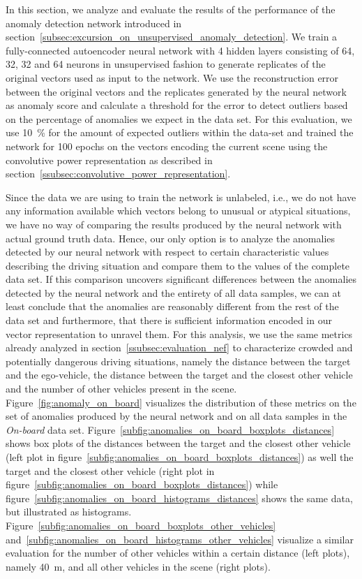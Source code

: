 In this section, we analyze and evaluate the results of the performance of the anomaly detection network introduced in section~\ref{subsec:excursion_on_unsupervised_anomaly_detection}.
We train a fully-connected autoencoder neural network with \num{4} hidden layers consisting of \num{64}, \num{32}, \num{32} and \num{64} neurons in unsupervised fashion to generate replicates of the original vectors used as input to the network.
We use the reconstruction error between the original vectors and the replicates generated by the neural network as anomaly score and calculate a threshold for the error to detect outliers based on the percentage of anomalies we expect in the data set.
For this evaluation, we use \SI{10}{\percent} for the amount of expected outliers within the data-set and trained the network for \num{100} epochs on the vectors encoding the current scene using the convolutive power representation as described in section~\ref{ssubsec:convolutive_power_representation}.

Since the data we are using to train the network is unlabeled, i.e., we do not have any information available which vectors belong to unusual or atypical situations, we have no way of comparing the results produced by the neural network with actual ground truth data.
Hence, our only option is to analyze the anomalies detected by our neural network with respect to certain characteristic values describing the driving situation and compare them to the values of the complete data set.
If this comparison uncovers significant differences between the anomalies detected by the neural network and the entirety of all data samples, we can at least conclude that the anomalies are reasonably different from the rest of the data set and furthermore, that there is sufficient information encoded in our vector representation to unravel them.
For this analysis, we use the same metrics already analyzed in section~\ref{ssubsec:evaluation_nef} to characterize crowded and potentially dangerous driving situations, namely the distance between the target and the ego-vehicle, the distance between the target and the closest other vehicle and the number of other vehicles present in the scene.
Figure~\ref{fig:anomaly_on_board} visualizes the distribution of these metrics on the set of anomalies produced by the neural network and on all data samples in the \emph{On-board} data set.
Figure~\ref{subfig:anomalies_on_board_boxplots_distances} shows box plots of the distances between the target and the closest other vehicle (left plot in figure~\ref{subfig:anomalies_on_board_boxplots_distances}) as well the target and the closest other vehicle (right plot in figure~\ref{subfig:anomalies_on_board_boxplots_distances}) while figure~\ref{subfig:anomalies_on_board_histograms_distances} shows the same data, but illustrated as histograms.
Figure~\ref{subfig:anomalies_on_board_boxplots_other_vehicles} and~\ref{subfig:anomalies_on_board_histograms_other_vehicles} visualize a similar evaluation for the number of other vehicles within a certain distance (left plots), namely \SI{40}{\meter}, and all other vehicles in the scene (right plots).

